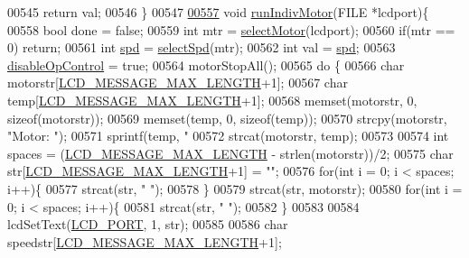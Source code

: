 \begin{DoxyCode}
{{{{{{{{00545     \textcolor{keywordflow}{return} val;
00546 \}
00547 
\hypertarget{lcddiag_8c_source.tex_l00557}{}\hyperlink{lcddiag_8c_ad4df85d8b386f9a60b097fd65cf27e3b}{00557} \textcolor{keywordtype}{void} \hyperlink{lcddiag_8c_ad4df85d8b386f9a60b097fd65cf27e3b}{runIndivMotor}(FILE *lcdport)\{
00558     \textcolor{keywordtype}{bool} done = \textcolor{keyword}{false};
00559     \textcolor{keywordtype}{int} mtr = \hyperlink{lcddiag_8c_ae7425e4ec1454bd0054bd4e1db7ea686}{selectMotor}(lcdport);
00560     \textcolor{keywordflow}{if}(mtr == 0) \textcolor{keywordflow}{return};
00561     \textcolor{keywordtype}{int} \hyperlink{opcontrol_8c_a642ce334330c8b0f6e33dd0a3fa65111}{spd} = \hyperlink{lcddiag_8c_a1f4f4ecd7b0c166456dd26a66e51f813}{selectSpd}(mtr);
00562     \textcolor{keywordtype}{int} val = \hyperlink{opcontrol_8c_a642ce334330c8b0f6e33dd0a3fa65111}{spd};
00563     \hyperlink{lcddiag_8c_a0f0b335cd078d025d6fb720eb3bf6437}{disableOpControl} = \textcolor{keyword}{true};
00564     motorStopAll();
00565     \textcolor{keywordflow}{do} \{
00566         \textcolor{keywordtype}{char} motorstr[\hyperlink{lcdmsg_8h_abe4c4b70fc6f44ae3680e5b2c68cdd00}{LCD\_MESSAGE\_MAX\_LENGTH}+1];
00567         \textcolor{keywordtype}{char} temp[\hyperlink{lcdmsg_8h_abe4c4b70fc6f44ae3680e5b2c68cdd00}{LCD\_MESSAGE\_MAX\_LENGTH}+1];
00568         memset(motorstr, 0, \textcolor{keyword}{sizeof}(motorstr));
00569         memset(temp, 0, \textcolor{keyword}{sizeof}(temp));
00570         strcpy(motorstr, \textcolor{stringliteral}{"Motor: "});
00571         sprintf(temp, \textcolor{stringliteral}{"%
00572         strcat(motorstr, temp);
00573 
00574         \textcolor{keywordtype}{int} spaces = (\hyperlink{lcdmsg_8h_abe4c4b70fc6f44ae3680e5b2c68cdd00}{LCD\_MESSAGE\_MAX\_LENGTH} - strlen(motorstr))/2;
00575         \textcolor{keywordtype}{char} str[\hyperlink{lcdmsg_8h_abe4c4b70fc6f44ae3680e5b2c68cdd00}{LCD\_MESSAGE\_MAX\_LENGTH}+1] = \textcolor{stringliteral}{""};
00576         \textcolor{keywordflow}{for}(\textcolor{keywordtype}{int} i = 0; i < spaces; i++)\{
00577             strcat(str, \textcolor{stringliteral}{" "});
00578         \}
00579         strcat(str, motorstr);
00580         \textcolor{keywordflow}{for}(\textcolor{keywordtype}{int} i = 0; i < spaces; i++)\{
00581             strcat(str, \textcolor{stringliteral}{" "});
00582         \}
00583 
00584         lcdSetText(\hyperlink{lcdmsg_8h_abcf42bd88b3c36193f301ca25b033875}{LCD\_PORT}, 1, str);
00585 
00586         \textcolor{keywordtype}{char} speedstr[\hyperlink{lcdmsg_8h_abe4c4b70fc6f44ae3680e5b2c68cdd00}{LCD\_MESSAGE\_MAX\_LENGTH}+1];
}}}}}}}}}
\end{DoxyCode}

